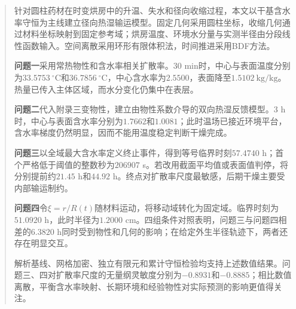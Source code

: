 \maketitle
\thispagestyle{plain}
\begin{abstract}

针对圆柱药材在时变烘房中的升温、失水和径向收缩过程，本文以干基含水率守恒为主线建立径向热湿输运模型。固定几何采用圆柱坐标，收缩几何通过材料坐标映射到固定参考域；烘房温度、环境水分量与实测半径由分段线性函数输入。空间离散采用环形有限体积法，时间推进采用BDF方法。

\textbf{问题一}采用常热物性和含水率相关扩散率。30 min时，中心与表面温度分别为$33.5753\ ^\circ\mathrm C$和$36.7856\ ^\circ\mathrm C$，中心含水率为$2.5500$，表面降至$1.5102\ \mathrm{kg/kg}$。热量已传入主体区域，而水分变化仍集中在表层。

\textbf{问题二}代入附录三变物性，建立由物性系数介导的双向热湿反馈模型。3 h时，中心与表面含水率分别为$1.7662$和$1.0081$；此时温场已接近环境平台，含水率梯度仍然明显，因而不能用温度稳定判断干燥完成。

\textbf{问题三}以全域最大含水率定义终止事件，得到等号临界时刻$57.4740$ h；首个严格低于阈值的整数秒为$206907$ s。若改用截面平均值或表面值判停，将分别提前约$21.45$ h和$44.92$ h。终点对扩散率尺度最敏感，后期干燥主要受内部输运制约。

\textbf{问题四}令$\xi=r/R(t)$随材料运动，将移动域转化为固定域。临界时刻为$51.0920$ h，此时半径为$1.2000$ cm。四组条件对照表明，问题三与问题四相差的$6.3820$ h同时受到物性和几何的影响；在给定外生半径轨迹下，两者还存在明显交互。

解析基线、网格加密、独立有限元和累计守恒检验均支持上述数值结果。问题三、四对扩散率尺度的无量纲灵敏度分别为$-0.8931$和$-0.8885$；相比数值离散，平衡含水率映射、长期环境和经验物性对实际预测的影响更值得关注。

\end{abstract}
